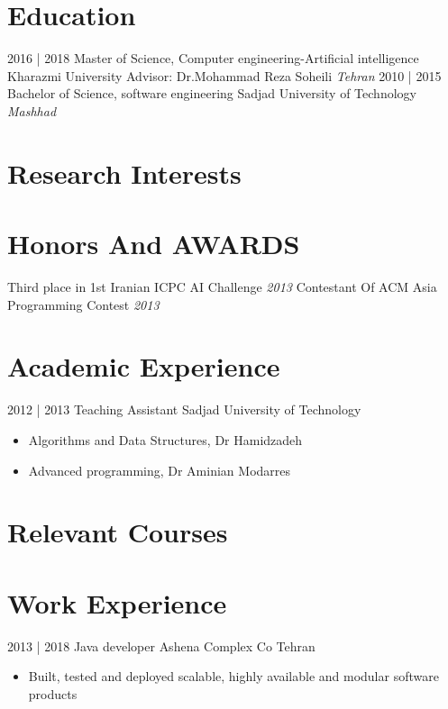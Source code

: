 \documentclass[letterpaper]{moderncv}        %
\begin{document}
\makecvtitle
    

\section{Education}

\cventry
{2016 | 2018}
{Master of Science, Computer engineering-Artificial intelligence}
{Kharazmi University}
{Advisor: Dr.Mohammad Reza Soheili}
{\textit{Tehran}}
{}
\cventry
{2010 | 2015}
{Bachelor of Science, software engineering}
{Sadjad University of Technology}
{}
{\textit{Mashhad}}
{}
\section{Research Interests}



\section{Honors And AWARDS}
\cventry
{}
{Third place in 1st Iranian ICPC AI Challenge}
{}
{\textit{2013}}
{}
{}
\vspace{1mm}
\cventry
{}
{Contestant Of ACM Asia Programming Contest}
{}
{\textit{2013}}
{}
{}
\vspace{1mm}

\section{Academic Experience}
\cventry
{2012 | 2013}
{Teaching Assistant}
{Sadjad University of Technology}
{}
{}
{\begin{itemize}%
	\item Algorithms and Data Structures, Dr Hamidzadeh
	\item Advanced programming, Dr Aminian Modarres 
	\end{itemize}}
	
\section{Relevant Courses}


\section{Work Experience}
\cventry
{2013 | 2018}
{Java developer}
{Ashena Complex Co}
{Tehran}
{}
{\begin{itemize}%
	\item Built, tested and deployed scalable, highly available and modular software products
	\end{itemize}}
\end{document}
